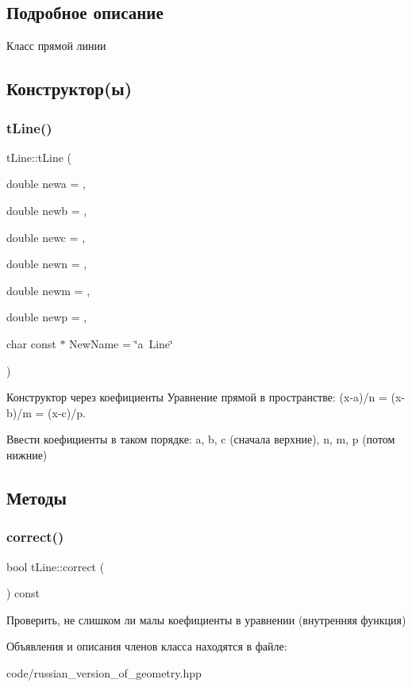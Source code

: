 \subsection{Подробное описание}
Класс прямой линии 

\subsection{Конструктор(ы)}
\mbox{\label{classtLine_ab61e326194db410630307c04cbbaf301}} 
\subsubsection{\texorpdfstring{t\+Line()}{tLine()}}
{\footnotesize\ttfamily t\+Line\+::t\+Line (\begin{DoxyParamCaption}\item[{double}]{newa = {},  }\item[{double}]{newb = {},  }\item[{double}]{newc = {},  }\item[{double}]{newn = {},  }\item[{double}]{newm = {},  }\item[{double}]{newp = {},  }\item[{char const $\ast$}]{New\+Name = {\ttfamily \char`\"{}a~Line\char`\"{}} }\end{DoxyParamCaption})}



Конструктор через коефициенты  Уравнение прямой в пространстве\+: (x-\/a)/n = (x-\/b)/m = (x-\/c)/p. 

Ввести коефициенты в таком порядке\+: a, b, c (сначала верхние), n, m, p (потом нижние) 

\subsection{Методы}
\mbox{\label{classtLine_aa824b319e4aa173d221ff28f55ec1890}} 
\subsubsection{\texorpdfstring{correct()}{correct()}}
{\footnotesize\ttfamily bool t\+Line\+::correct (\begin{DoxyParamCaption}{ }\end{DoxyParamCaption}) const}

Проверить, не слишком ли малы коефициенты в уравнении (внутренняя функция) 

Объявления и описания членов класса находятся в файле\+:\begin{DoxyCompactItemize}
\item 
code/russian\+\_\+version\+\_\+of\+\_\+geometry.\+hpp\end{DoxyCompactItemize}
